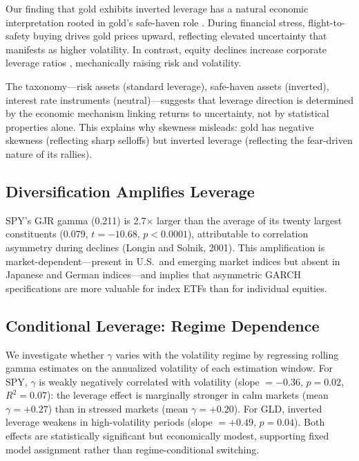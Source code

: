 Our finding that gold exhibits inverted leverage has a natural economic interpretation rooted in gold's safe-haven role \citep{baur2010safe}. During financial stress, flight-to-safety buying drives gold prices upward, reflecting elevated uncertainty that manifests as higher volatility. In contrast, equity declines increase corporate leverage ratios \citep{black1976}, mechanically raising risk and volatility.

The taxonomy---risk assets (standard leverage), safe-haven assets (inverted), interest rate instruments (neutral)---suggests that leverage direction is determined by the economic mechanism linking returns to uncertainty, not by statistical properties alone. This explains why skewness misleads: gold has negative skewness (reflecting sharp selloffs) but inverted leverage (reflecting the fear-driven nature of its rallies).

\subsection{Diversification Amplifies Leverage}

SPY's GJR gamma (0.211) is 2.7$\times$ larger than the average of its twenty largest constituents (0.079, $t = -10.68$, $p < 0.0001$), attributable to correlation asymmetry during declines (Longin and Solnik, 2001). This amplification is market-dependent---present in U.S.\ and emerging market indices but absent in Japanese and German indices---and implies that asymmetric GARCH specifications are more valuable for index ETFs than for individual equities.

\subsection{Conditional Leverage: Regime Dependence}

We investigate whether $\gamma$ varies with the volatility regime by regressing rolling gamma estimates on the annualized volatility of each estimation window. For SPY, $\gamma$ is weakly negatively correlated with volatility (slope $= -0.36$, $p = 0.02$, $R^2 = 0.07$): the leverage effect is marginally stronger in calm markets (mean $\gamma = +0.27$) than in stressed markets (mean $\gamma = +0.20$). For GLD, inverted leverage weakens in high-volatility periods (slope $= +0.49$, $p = 0.04$). Both effects are statistically significant but economically modest, supporting fixed model assignment rather than regime-conditional switching.

